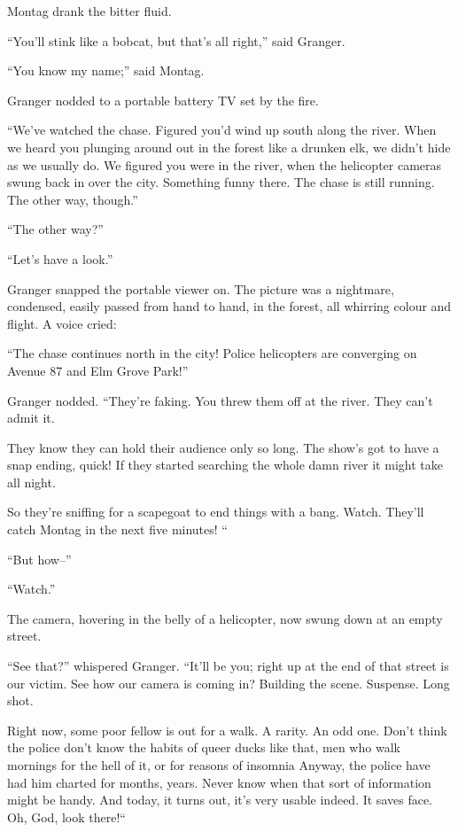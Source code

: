 \documentclass[11pt,openany]{book}
\begin{document}
Montag drank the bitter fluid.

``You'll stink like a bobcat, but that's all right,'' said Granger.

``You know my name;'' said Montag.

Granger nodded to a portable battery TV set by the fire.

``We've watched the chase. Figured you'd wind up south along the river. When we heard you plunging around out in the forest like a drunken elk, we didn't hide as we usually do. We figured you were in the river, when the helicopter cameras swung back in over the city. Something funny there. The chase is still running. The other way, though.''

``The other way?''

``Let's have a look.''

Granger snapped the portable viewer on. The picture was a nightmare, condensed, easily passed from hand to hand, in the forest, all whirring colour and flight. A voice cried:

``The chase continues north in the city! Police helicopters are converging on Avenue 87 and Elm Grove Park!''

Granger nodded. ``They're faking. You threw them off at the river. They can't admit it.

They know they can hold their audience only so long. The show's got to have a snap ending, quick! If they started searching the whole damn river it might take all night.

So they're sniffing for a scapegoat to end things with a bang. Watch. They'll catch Montag in the next five minutes! ``

``But how--''

``Watch.''

The camera, hovering in the belly of a helicopter, now swung down at an empty street.

``See that?'' whispered Granger. ``It'll be you; right up at the end of that street is our victim. See how our camera is coming in? Building the scene. Suspense. Long shot.

Right now, some poor fellow is out for a walk. A rarity. An odd one. Don't think the police don't know the habits of queer ducks like that, men who walk mornings for the hell of it, or for reasons of insomnia Anyway, the police have had him charted for months, years. Never know when that sort of information might be handy. And today, it turns out, it's very usable indeed. It saves face. Oh, God, look there!``
\end{document}
